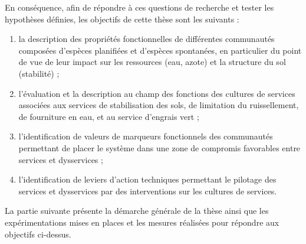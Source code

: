 En conséquence, afin de répondre à ces questions de recherche et tester les hypothèses définies, les objectifs de cette thèse sont les suivants :
\begin{enumerate}
\item la description des propriétés fonctionnelles de différentes communautés composées d'espèces planifiées et d'espèces spontanées, en particulier du point de vue de leur impact sur les ressources (eau, azote) et la structure du sol (stabilité) ;
\item l'évaluation et la description au champ des fonctions des cultures de services associées aux services de stabilisation des sols, de limitation du ruissellement, de fourniture en eau, et au service d'engrais vert ;
\item l'identification de valeurs de marqueurs fonctionnels des communautés permettant de placer le système dans une zone de compromis favorables entre services et dysservices ;
\item l'identification de leviers d'action techniques permettant le pilotage des services et dysservices par des interventions sur les cultures de services.
\end{enumerate}

La partie suivante présente la démarche générale de la thèse ainsi que les expérimentations mises en places et les mesures réalisées pour répondre aux objectifs ci-dessus.
